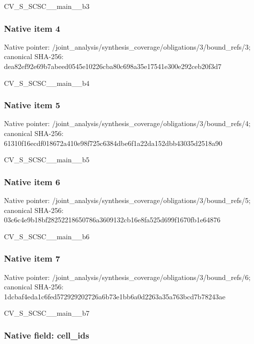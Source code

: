 \documentclass[10pt,a4paper]{article}
\begin{document}
CV\_S\_SCSC\_\_main\_\_b3


\subsubsection{Native item 4}


Native pointer: /joint\_analysis/synthesi\allowbreak{}s\_coverage/obligations/3\allowbreak{}/bound\_refs/3; canonical SHA-256: dea82ef92e69b7abeed0545e\allowbreak{}10226cba80c698a35e17541e\allowbreak{}300e292ceb20f3d7


CV\_S\_SCSC\_\_main\_\_b4


\subsubsection{Native item 5}


Native pointer: /joint\_analysis/synthesi\allowbreak{}s\_coverage/obligations/3\allowbreak{}/bound\_refs/4; canonical SHA-256: 61310f16ecdf018672a410e9\allowbreak{}8f725c6384dbe6f1a22da152\allowbreak{}dbb43035d2518a90


CV\_S\_SCSC\_\_main\_\_b5


\subsubsection{Native item 6}


Native pointer: /joint\_analysis/synthesi\allowbreak{}s\_coverage/obligations/3\allowbreak{}/bound\_refs/5; canonical SHA-256: 03c6c4e9b18bf28252218650\allowbreak{}786a3609132cb16e8fa525d6\allowbreak{}99f1670fb1e64876


CV\_S\_SCSC\_\_main\_\_b6


\subsubsection{Native item 7}


Native pointer: /joint\_analysis/synthesi\allowbreak{}s\_coverage/obligations/3\allowbreak{}/bound\_refs/6; canonical SHA-256: 1dcbaf4eda1c6fed57292920\allowbreak{}2726a6b73e1bb6a0d2263a35\allowbreak{}a763bcd7b78243ae


CV\_S\_SCSC\_\_main\_\_b7


\subsubsection{Native field: cell\_ids}
\end{document}
